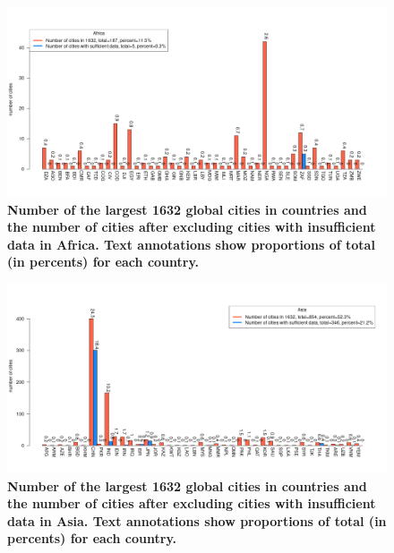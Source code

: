 \documentclass[preprint,10pt]{elsarticle} %
\begin{document}
{%
\begin{figure}
\centering
\includegraphics[trim={ 0 35 25 50 },clip,scale=0.45]{Images2/Africa_cities_Rev2.png}
\caption{\bf Number of the largest 1632 global cities in countries and the number of cities after excluding cities with insufficient data in Africa. Text annotations show proportions of total (in percents) for each country.}
 \label{fig:africa}
\end{figure}

\begin{figure}
\centering
\includegraphics[trim={ 0 35 25 50 },clip,scale=0.45]{Images2/Asia_cities_Rev2.png}
\caption{\bf Number of the largest 1632 global cities in countries and the number of cities after excluding cities with insufficient data in Asia. Text annotations show proportions of total (in percents) for each country.}
 \label{fig:asia}
\end{figure}

}
\end{document}
